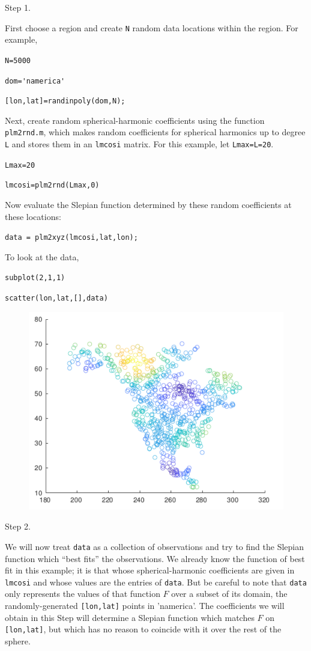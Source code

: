 \documentclass{article}
\begin{document}
\setlength{\parskip}{0.5cm plus4mm minus3mm}

Step 1.

First choose a region and create \verb!N! random data locations within the region. For example,

\verb!N=5000!

\verb!dom='namerica'!

\verb![lon,lat]=randinpoly(dom,N);!

Next, create random spherical-harmonic coefficients using the function \verb!plm2rnd.m!, which makes random coefficients for spherical harmonics up to degree \verb!L! and stores them in an \verb!lmcosi! matrix. For this example, let \verb!Lmax=L=20!.

\verb!Lmax=20!

\verb!lmcosi=plm2rnd(Lmax,0)!

Now evaluate the Slepian function determined by these random coefficients at these locations:

\verb!data = plm2xyz(lmcosi,lat,lon);!

To look at the data,

\verb!subplot(2,1,1)!

\verb!scatter(lon,lat,[],data)! 

\begin{figure}[H]
\includegraphics[scale=.6]{namerica_randomdata}
\end{figure}

Step 2.

We will now treat \verb!data! as a collection of observations and try to find the Slepian function which “best fits” the observations. We already know the function of best fit in this example; it is that whose spherical-harmonic coefficients are given in \verb!lmcosi! and whose values are the entries of \verb!data!. But be careful to note that \verb!data! only represents the values of that function $F$ over a subset of its domain, the randomly-generated \verb![lon,lat]! points in 'namerica'. The coefficients we will obtain in this Step will determine a Slepian function which matches $F$ on \verb![lon,lat]!, but which has no reason to coincide with it over the rest of the sphere. 
\end{document}
